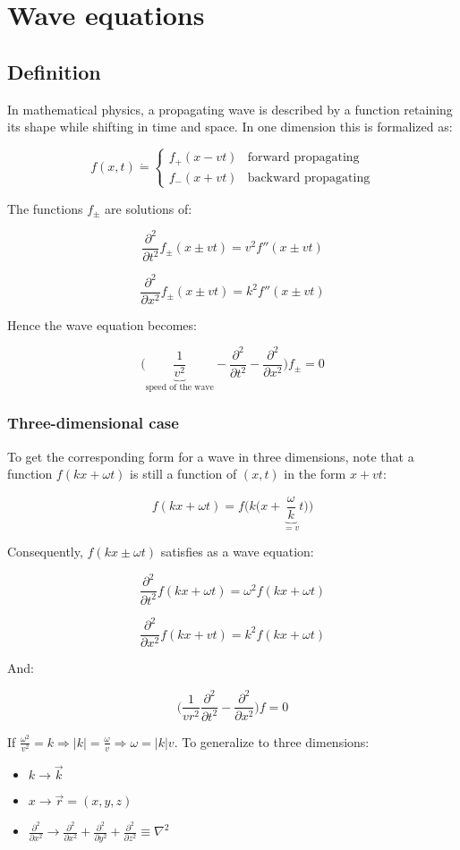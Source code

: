 \chapter{Wave equations}

\section{Definition}
In mathematical physics, a propagating wave is described by a function retaining its shape while shifting in time and space.
In one dimension this is formalized as:

$$f(x,t)\dot{=}\begin{cases}f_+(x-v t) &\text{forward propagating}\\f_-(x+vt) &\text{backward propagating}\end{cases}$$

The functions $f_\pm$ are solutions of:

$$\frac{\partial^2{}}{\partial{t^2}}f_\pm(x\pm vt) = v^2f''(x\pm vt)$$

$$\frac{\partial^2{}}{\partial{x^2}}f_\pm(x\pm vt) = k^2f''(x\pm vt)$$

Hence the wave equation becomes:

$$\biggl(\underbrace{\frac{1}{v^2}}_{\text{speed of the wave}}-\frac{\partial^2{}}{\partial{t^2}}-\frac{\partial^2{}}{\partial{x^2}}\biggr)f_\pm = 0$$

  \subsection{Three-dimensional case}
  To get the corresponding form for a wave in three dimensions, note that a function $f(kx + \omega t)$ is still a function of $(x,t)$ in the form $x+vt$:

  $$f(kx+\omega t) = f\biggl(k\biggl(x+\underbrace{\frac{\omega}{k}}_{=v}t\biggr)\biggr)$$

  Consequently, $f(kx\pm\omega t)$ satisfies as a wave equation:

  $$\frac{\partial^2{}}{\partial{t^2}}f(kx+ \omega t) = \omega^2f(kx+ \omega t)$$

  $$\frac{\partial^2{}}{\partial{x^2}}f(kx + vt) = k^2f(kx + \omega t)$$

  And:

  $$\biggl(\frac{1}{vr^2}\frac{\partial^2{}}{\partial{t^2}} - \frac{\partial^2{}}{\partial{x^2}}\biggr)f = 0$$

  If $\frac{\omega^2}{v^2} = k\Rightarrow |k| = \frac{\omega}{v}\Rightarrow \omega = |k|v$.
  To generalize to three dimensions:
  \begin{itemize}
    \item $k\rightarrow \vec{k}$
    \item $x\rightarrow \vec{r}=(x,y,z)$
    \item $\frac{\partial^2{}}{\partial{x^2}}\rightarrow \frac{\partial^2{}}{\partial{x^2}}+\frac{\partial^2{}}{\partial{y^2}}+\frac{\partial^2{}}{\partial{z^2}}\equiv\nabla^2$
  \end{itemize}

